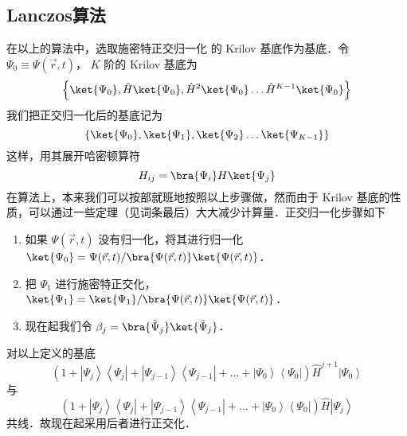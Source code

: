 \subsection{Lanczos算法}
在以上的算法中，选取施密特正交归一化 %
的 Krilov 基底作为基底．令 $\Psi_0 \equiv \Psi(\vec r, t)$，  $K$ 阶的 Krilov 基底为
 \begin{equation}
\left\{ \ket{\Psi_0}, \hat H \ket{\Psi_0}, \hat H^2 \ket{\Psi_0} \dots \hat H^{K-1} \ket{\Psi_0} \right\}
\end{equation}
我们把正交归一化后的基底记为
 \begin{equation}
\left\{ \ket{\Psi_0}, \ket{\Psi_1}, \ket{\Psi_2} \dots \ket{\Psi_{K-1}} \right\}
\end{equation}
这样，用其展开哈密顿算符
\begin{equation}
H_{ij}=\bra{\Psi_i} H \ket{\Psi_j}
\end{equation}
在算法上，本来我们可以按部就班地按照以上步骤做，然而由于 Krilov 基底的性质，可以通过一些定理（见词条最后）大大减少计算量．正交归一化步骤如下

\begin{enumerate}
\item 如果 $\Psi(\vec r,t)$ 没有归一化，将其进行归一化 $\ket{\Psi_0}=\Psi(\vec r,t)/\bra{\Psi(\vec r,t)}\ket{\Psi(\vec r,t)}$．
\item 把 $\Psi_1$ 进行施密特正交化， $\ket{\Psi_1}=\ket{\Psi_1}/\bra{\Psi(\vec r,t)}\ket{\Psi(\vec r,t)}$．  %
\item 现在起我们令 $\beta_j = \bra{\tilde\Psi_j}\ket{\tilde\Psi_j}$． %
\end{enumerate}

{\noindent {}}
对以上定义的基底
\begin{equation}
\left( {1 + \left| {{\Psi_j}} \right\rangle \left\langle {{\Psi_j}} \right| + \left| {{\Psi_{j - 1}}} \right\rangle \left\langle {{\Psi_{j - 1}}} \right| + ... + \left| {{\Psi_0}} \right\rangle \left\langle {{\Psi_0}} \right|} \right){\hat H^{j + 1}}\left| {{\Psi_0}} \right\rangle
\end{equation}
与
\begin{equation}
\left( {1 + \left| {{\Psi_j}} \right\rangle \left\langle {{\Psi_j}} \right| + \left| {{\Psi_{j - 1}}} \right\rangle \left\langle {{\Psi_{j - 1}}} \right| + ... + \left| {{\Psi_0}} \right\rangle \left\langle {{\Psi_0}} \right|} \right)\hat H\left| {{\Psi_j}} \right\rangle 
\end{equation}
共线．故现在起采用后者进行正交化．

